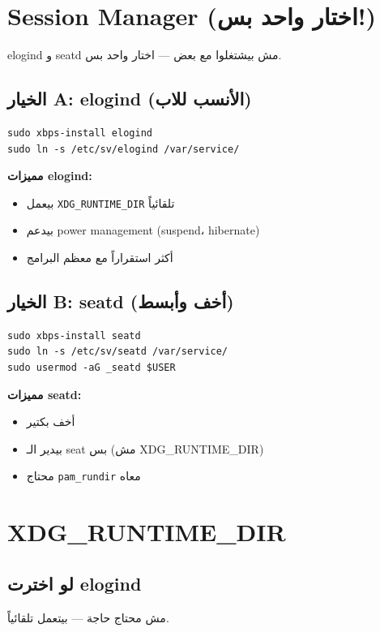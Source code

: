 \documentclass[12pt, a4paper]{report}
\begin{document}
\section{Session Manager (اختار واحد بس!)}

\begin{tcolorbox}[warningbox]
elogind و seatd مش بيشتغلوا مع بعض --- اختار واحد بس.
\end{tcolorbox}

\subsection{الخيار A: elogind (الأنسب للاب)}
\begin{lstlisting}
sudo xbps-install elogind
sudo ln -s /etc/sv/elogind /var/service/
\end{lstlisting}

\textbf{مميزات elogind:}
\begin{itemize}[leftmargin=*]
  \item بيعمل \texttt{XDG\_RUNTIME\_DIR} تلقائياً
  \item بيدعم power management (suspend، hibernate)
  \item أكثر استقراراً مع معظم البرامج
\end{itemize}

\subsection{الخيار B: seatd (أخف وأبسط)}
\begin{lstlisting}
sudo xbps-install seatd
sudo ln -s /etc/sv/seatd /var/service/
sudo usermod -aG _seatd $USER
\end{lstlisting}

\textbf{مميزات seatd:}
\begin{itemize}[leftmargin=*]
  \item أخف بكتير
  \item بيدير الـ seat بس (مش XDG\_RUNTIME\_DIR)
  \item محتاج \texttt{pam\_rundir} معاه
\end{itemize}

\section{XDG\_RUNTIME\_DIR}

\subsection{لو اخترت elogind}
مش محتاج حاجة --- بيتعمل تلقائياً.
\end{document}
